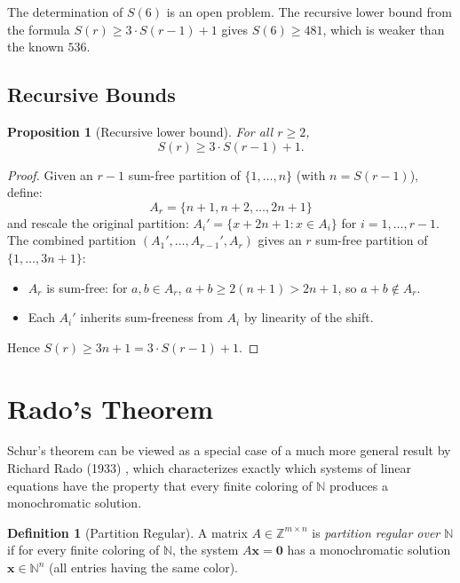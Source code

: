 \documentclass[12pt,a4paper]{amsart}
\newtheorem{proposition}[theorem]{Proposition}
\theoremstyle{definition}
\newtheorem{definition}[theorem]{Definition}
\newcommand{\N}{\mathbb{N}}
\newcommand{\Z}{\mathbb{Z}}
\begin{document}
The determination of $S(6)$ is an open problem. The recursive lower bound from the
formula $S(r) \geq 3 \cdot S(r-1) + 1$ gives $S(6) \geq 481$, which is weaker than
the known $536$.

\subsection{Recursive Bounds}

\begin{proposition}[Recursive lower bound]
For all $r \geq 2$,
\[
  S(r) \geq 3 \cdot S(r-1) + 1.
\]
\end{proposition}

\begin{proof}
Given an $r-1$ sum-free partition of $\{1,\ldots,n\}$ (with $n = S(r-1)$), define:
\[
  A_r = \{n+1, n+2, \ldots, 2n+1\}
\]
and rescale the original partition: $A_i' = \{x + 2n + 1 : x \in A_i\}$ for
$i = 1, \ldots, r-1$. The combined partition $(A_1', \ldots, A_{r-1}', A_r)$ gives
an $r$ sum-free partition of $\{1, \ldots, 3n+1\}$:
\begin{itemize}
\item $A_r$ is sum-free: for $a, b \in A_r$, $a + b \geq 2(n+1) > 2n+1$, so $a+b \notin A_r$.
\item Each $A_i'$ inherits sum-freeness from $A_i$ by linearity of the shift.
\end{itemize}
Hence $S(r) \geq 3n + 1 = 3 \cdot S(r-1) + 1$.
\end{proof}

\section{Rado's Theorem}\label{sec:rado}

Schur's theorem can be viewed as a special case of a much more general result by
Richard Rado (1933) \cite{Rado1933}, which characterizes exactly which systems of
linear equations have the property that every finite coloring of $\N$ produces a
monochromatic solution.

\begin{definition}[Partition Regular]
A matrix $A \in \Z^{m \times n}$ is \emph{partition regular over $\N$} if for every
finite coloring of $\N$, the system $A\mathbf{x} = \mathbf{0}$ has a monochromatic
solution $\mathbf{x} \in \N^n$ (all entries having the same color).
\end{definition}
\end{document}
